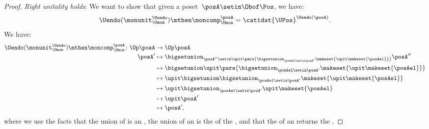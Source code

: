 \begin{proof}
    \emph{Right unitality holds}: We want to show that given a poset~$\posA\setin \Obof\Pos$, we have:
    \begin{equation}
        \Uendo(\monunit_{\Umon}^{\Uendo})\mthen \moncomp_{\Umon}^{\posA}=\catidat{\UPos}^{\Uendo(\posA)}.
    \end{equation}
    We have:
    \begin{equation}
        \begin{aligned}
            \Uendo(\monunit_{\Umon}^{\Uendo})\mthen \moncomp_{\Umon}^{\posA}\colon \Up \posA & \to \Up \posA \\
            \posA'                                                                           & \mapsto \bigsetunion_{\posA''\setin \upit \pars{ \bigsetunion_{\posAel \setin \posA'}\makeset{ \upit \makeset{\posAel}}}}\posA'' \\
                                                                                             & \mapsto \bigsetunion \upit \pars{ \bigsetunion_{\posAel \setin \posA'}\makeset{\upit \makeset{ \posAel} }} \\
                                                                                             & \mapsto \upit \bigsetunion   \bigsetunion_{\posAel \setin \posA'}\makeset{\upit \makeset{ \posAel} } \\
                                                                                             & \mapsto \upit \bigsetunion_{\posAel \setin \posA'}\upit \makeset{ \posAel} \\
                                                                                             & \mapsto \upit \posA' \\
                                                                                             & \mapsto \posA',
        \end{aligned}
    \end{equation}
    where we use the facts that the union of  is an , the union of an  is the  of the , and that the  of an  returns the .


\end{proof}
